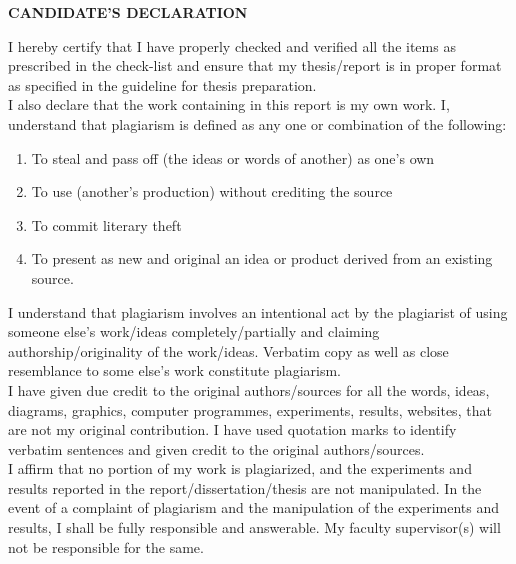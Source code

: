 \documentclass[12pt,a4paper]{article}
\newlength{\defbaselineskip}
\newcommand{\setlinespacing}[1]%
           {\setlength{\baselineskip}{#1 \defbaselineskip}}
\begin{document}
\newpage
\setcounter{page}{1}
\setlinespacing{1}
\begin{center}
{\large \bf CANDIDATE'S DECLARATION}
\end{center}
I hereby certify that I have properly checked and verified all the items as prescribed in the check-list and ensure that my thesis/report is in proper format as specified in the guideline for thesis preparation.\\

\noindent I also declare that the work containing in this report is my own work. I, understand that plagiarism is defined as any one or combination of the following:
\begin{enumerate}
\item To steal and pass off (the ideas or words of another) as one's own
\item To use (another's production) without crediting the source
\item To commit literary theft
\item To present as new and original an idea or product derived from an existing source.
\end{enumerate}
I understand that plagiarism involves an intentional act by the plagiarist of using someone else's work/ideas completely/partially and claiming authorship/originality of the work/ideas. Verbatim copy as well as close resemblance to some else's work constitute plagiarism.\\

\noindent I have given due credit to the original authors/sources for all the words, ideas, diagrams, graphics, computer programmes, experiments, results, websites, that are not my original contribution. I have used quotation marks to identify verbatim sentences and given credit to the original authors/sources.\\

\noindent I affirm that no portion of my work is plagiarized, and the experiments and results reported in the report/dissertation/thesis are not manipulated. In the event of a complaint of plagiarism and the manipulation of the experiments and results, I shall be fully responsible and answerable. My faculty supervisor(s) will not be responsible for the same.\vspace{1cm}\\
\end{document}
